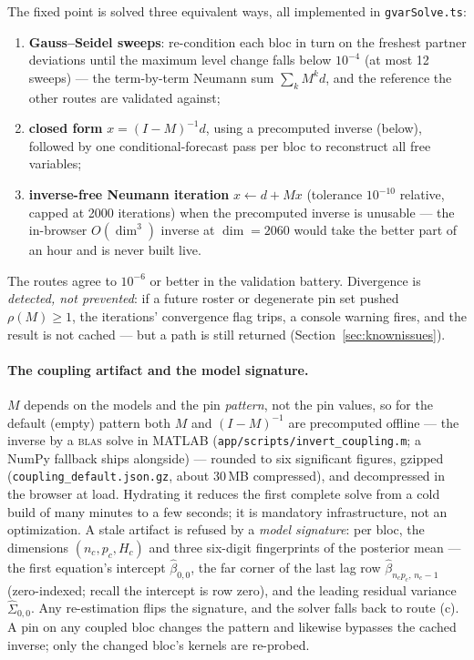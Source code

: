 \documentclass[11pt]{article}
\theoremstyle{plain}
\theoremstyle{remark}
\begin{document}
The fixed point is solved three equivalent ways, all implemented in
\texttt{gvarSolve.ts}:
\begin{enumerate}[label=(\alph*)]
  \item \textbf{Gauss--Seidel sweeps}: re-condition each bloc in turn on
    the freshest partner deviations until the maximum level change falls
    below $10^{-4}$ (at most 12 sweeps) --- the term-by-term Neumann sum
    $\sum_k M^k d$, and the reference the other routes are validated
    against;
  \item \textbf{closed form} $x = (I-M)^{-1} d$, using a precomputed
    inverse (below), followed by one conditional-forecast pass per bloc
    to reconstruct all free variables;
  \item \textbf{inverse-free Neumann iteration} $x \leftarrow d + Mx$
    (tolerance $10^{-10}$ relative, capped at 2000 iterations) when the
    precomputed inverse is unusable --- the in-browser $O(\dim^3)$
    inverse at $\dim = 2060$ would take the better part of an hour and
    is never built live.
\end{enumerate}
The routes agree to $10^{-6}$ or better in the validation battery.
Divergence is \emph{detected, not prevented}: if a future roster or
degenerate pin set pushed $\rho(M) \ge 1$, the iterations' convergence
flag trips, a console warning fires, and the result is not cached ---
but a path is still returned (Section~\ref{sec:knownissues}).

\paragraph{The coupling artifact and the model signature.}\label{sec:modelsig}
$M$ depends on the models and the pin \emph{pattern}, not the pin
values, so for the default (empty) pattern both $M$ and $(I-M)^{-1}$ are
precomputed offline --- the inverse by a \textsc{blas} solve in MATLAB
(\texttt{app/scripts/invert\_coupling.m}; a NumPy fallback ships
alongside) --- rounded to six significant figures, gzipped
(\texttt{coupling\_default.json.gz}, about 30\,MB compressed), and
decompressed in the browser at load. Hydrating it reduces the first
complete solve from a cold build of many minutes to a few seconds; it is
mandatory infrastructure, not an optimization. A stale artifact is
refused by a \emph{model signature}: per bloc, the dimensions
$(n_c, p_c, H_c)$ and three six-digit fingerprints of the posterior mean
--- the first equation's intercept $\hat\beta_{0,0}$, the far corner of
the last lag row $\hat\beta_{n_c p_c,\, n_c-1}$ (zero-indexed; recall
the intercept is row zero), and the leading residual variance
$\hat\Sigma_{0,0}$. Any re-estimation flips the signature, and the
solver falls back to route (c). A pin on any coupled bloc changes the
pattern and likewise bypasses the cached inverse; only the changed
bloc's kernels are re-probed.
\end{document}
